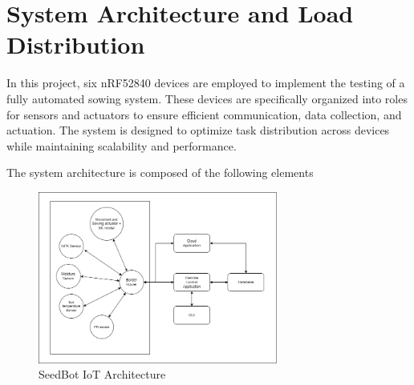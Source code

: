 \chapter{System Architecture and Load Distribution}

In this project, six nRF52840 devices are employed to implement the testing of a fully automated sowing system. These devices are specifically organized into roles for sensors and actuators to ensure efficient communication, data collection, and actuation. The system is designed to optimize task distribution across devices while maintaining scalability and performance.

The system architecture is composed of the following elements

\begin{figure}[H]
    \centering
    \includegraphics[width=0.7\textwidth]{media/IoT_architecture.png}
    \caption{SeedBot IoT Architecture}
    \label{fig:IoT_architecture}
\end{figure}

